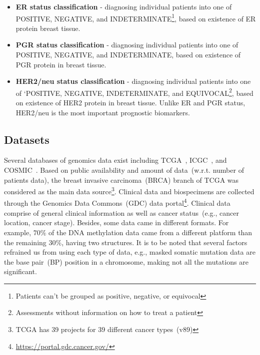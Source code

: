 \begin{itemize}
    \item \textbf{ER status classification} - diagnosing individual patients into one of POSITIVE, NEGATIVE, and INDETERMINATE\footnote{Patients can't be grouped as positive, negative, or equivocal}, based on existence of ER protein breast tissue. 
    \item \textbf{PGR status classification} - diagnosing individual patients into one of POSITIVE, NEGATIVE, and INDETERMINATE, based on existence of PGR protein in breast tissue. 
    \item \textbf{HER2/neu status classification} - diagnosing individual patients into one of `POSITIVE, NEGATIVE, INDETERMINATE, and EQUIVOCAL\footnote{Assessments without information on how to treat a patient}, based on existence of HER2 protein in breast tissue. Unlike ER and PGR status, HER2/neu is the most important prognostic biomarkers. 
\end{itemize}

\subsection{Datasets}
\label{dc}
Several databases of genomics data exist including TCGA~\cite{tcga}, ICGC~\cite{icgc}, and COSMIC~\cite{forbes}. Based on public availability and amount of data~(w.r.t. number of patients data), the breast invasive carcinoma~(BRCA) branch of TCGA was considered as the main data source\footnote{TCGA has 39 projects for 39 different cancer types~(v89)}. Clinical data and biospecimens are collected through the Genomics Data Commons~(GDC) data portal\footnote{\url{https://portal.gdc.cancer.gov/}}. Clinical data comprise of general clinical information as well as cancer status~(e.g., cancer location, cancer stage). Besides, some data came in different formats. For example, $70\%$ of the DNA methylation data came from a different platform than the remaining $30\%$, having two structures. It is to be noted that several factors refrained us from using each type of data, e.g., masked somatic mutation data are the base pair~(BP) position in a chromosome, making not all the mutations are significant. 

